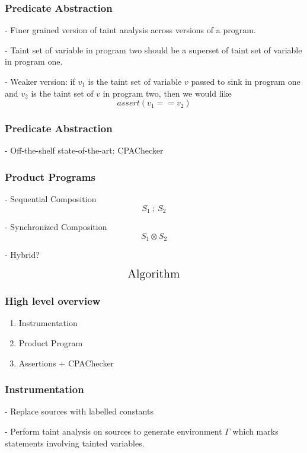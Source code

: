 \documentclass{beamer} %
\theoremstyle{definition} %
\newcommand{\cross}{\otimes{}}
\begin{document}
\begin{frame}
\frametitle{Predicate Abstraction}

	- Finer grained version of taint analysis across versions of a program.

	- Taint set of variable in program two should be a superset of taint set of variable in program one.

	\pause

	- Weaker version: if $v_1$ is the taint set of variable $v$ passed to sink in program one and $v_2$ is the taint set of $v$ in program two, then we would like \[assert(v_1 == v_2)\]

\end{frame}

\begin{frame}
\frametitle{Predicate Abstraction}

	- Off-the-shelf state-of-the-art: CPAChecker

\end{frame}

\begin{frame}
\frametitle{Product Programs}

	- Sequential Composition \[S_1\ ;\ S_2\]

	\pause

	- Synchronized Composition \[S_1 \cross S_2\]

	\pause

	- Hybrid?

\end{frame}

\begin{frame}
	\[\text{\Large{Algorithm}}\]
\end{frame}

\begin{frame}
\frametitle{High level overview}

	\begin{enumerate}
		\item Instrumentation
		\item Product Program
		\item Assertions + CPAChecker
	\end{enumerate}

\end{frame}

\begin{frame}
\frametitle{Instrumentation}
	
	- Replace sources with labelled constants

	- Perform taint analysis on sources to generate environment $\Gamma$ which marks statements involving tainted variables. 

\end{frame}
\end{document}
